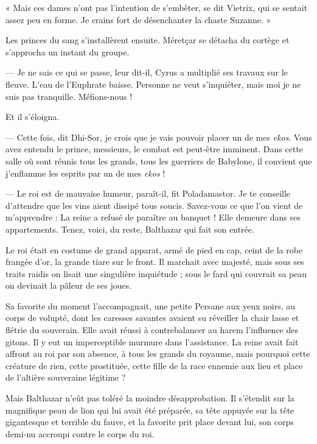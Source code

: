 \documentclass[a4paper, 11pt, oneside, polutonikogreek, french]{article}
\begin{document}
« Mais ces dames n'ont pas l'intention de s'embêter, se dit Vietrix, qui se sentait assez peu en forme. Je crains fort de désenchanter la chaste Suzanne. »

Les princes du sang s'installèrent ensuite. Méretçar se détacha du cortège et s'approcha un instant du groupe.

--- Je ne sais ce qui se passe, leur dit-il, Cyrus a multiplié ses travaux sur le fleuve. L'eau de l'Euphrate baisse. Personne ne veut s'inquiéter, mais moi je ne suis pas tranquille. Méfions-nous !

Et il s'éloigna.

--- Cette fois, dit Dhi-Sor, je crois que je vais pouvoir placer un de mes \emph{ekos}. Vous avez entendu le prince, messieurs, le combat est peut-être imminent. Dans cette salle où sont réunis tous les grands, tous les guerriers de Babylone, il convient que j'enflamme les esprits par un de mes \emph{ekos} !

--- Le roi est de mauvaise humeur, paraît-il, fit Poladamastor. Je te conseille d'attendre que les vins aient dissipé tous soucis. Savez-vous ce que l'on vient de m'apprendre : La reine a refusé de paraître au banquet ! Elle demeure dans ses appartements. Tenez, voici, du reste, Balthazar qui fait son entrée.

\bigskip
\centerline{\EightStarTaper}
\centerline{\EightStarTaper\EightStarTaper}
\bigskip

Le roi était en costume de grand apparat, armé de pied en cap, ceint de la robe frangée d'or, la grande tiare sur le front. Il marchait avec majesté, mais sous ses traits raidis on lisait une singulière inquiétude ; sous le fard qui couvrait sa peau on devinait la pâleur de ses joues.

Sa favorite du moment l'accompagnait, une petite Persane aux yeux noirs, au corps de volupté, dont les caresses savantes avaient su réveiller la chair lasse et flétrie du souverain. Elle avait réussi à contrebalancer au harem l'influence des gitons. Il y eut un imperceptible murmure dans l'assistance. La reine avait fait affront au roi par son absence, à tous les grands du royaume, mais pourquoi cette créature de rien, cette prostituée, cette fille de la race ennemie aux lieu et place de l'altière souveraine légitime ?

Mais Balthazar n'eût pas toléré la moindre désapprobation. Il s'étendit sur la magnifique peau de lion qui lui avait été préparée, sa tête appuyée sur la tête gigantesque et terrible du fauve, et la favorite prit place devant lui, son corps demi-nu accroupi contre le corps du roi.
\end{document}
